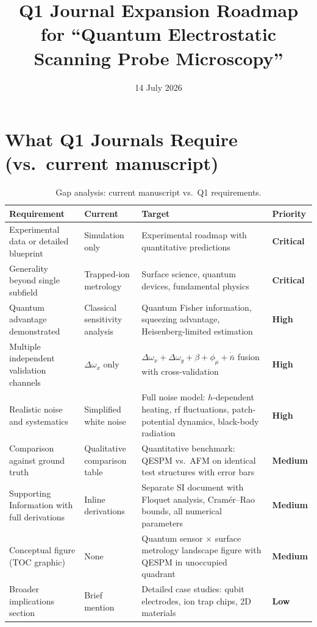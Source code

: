 \documentclass[11pt,a4paper]{article}
\begin{document}
\title{\bfseries Q1 Journal Expansion Roadmap\\
       for ``Quantum Electrostatic Scanning Probe Microscopy''}
\date{14 July 2026}

\maketitle

\section{What Q1 Journals Require (vs.\ current manuscript)}

\begin{table}[htb]
\centering
\caption{Gap analysis: current manuscript vs.\ Q1 requirements.}
\small
\begin{tabular}{@{}p{3.2cm}lll@{}}
\toprule
Requirement & Current & Target & Priority \\
\midrule
Experimental data or detailed blueprint & Simulation only & Experimental roadmap with quantitative predictions & \textbf{Critical} \\
Generality beyond single subfield & Trapped-ion metrology & Surface science, quantum devices, fundamental physics & \textbf{Critical} \\
Quantum advantage demonstrated & Classical sensitivity analysis & Quantum Fisher information, squeezing advantage, Heisenberg-limited estimation & \textbf{High} \\
Multiple independent validation channels & $\Delta\omega_x$ only & $\Delta\omega_x + \Delta\omega_y + \beta + \phi_\mu + \dot{\bar{n}}$ fusion with cross-validation & \textbf{High} \\
Realistic noise and systematics & Simplified white noise & Full noise model: $h$-dependent heating, rf fluctuations, patch-potential dynamics, black-body radiation & \textbf{High} \\
Comparison against ground truth & Qualitative comparison table & Quantitative benchmark: QESPM vs.\ AFM on identical test structures with error bars & \textbf{Medium} \\
Supporting Information with full derivations & Inline derivations & Separate SI document with Floquet analysis, Cram\'er--Rao bounds, all numerical parameters & \textbf{Medium} \\
Conceptual figure (TOC graphic) & None & Quantum sensor $\times$ surface metrology landscape figure with QESPM in unoccupied quadrant & \textbf{Medium} \\
Broader implications section & Brief mention & Detailed case studies: qubit electrodes, ion trap chips, 2D materials & \textbf{Low} \\
\bottomrule
\end{tabular}
\end{table}
\end{document}
